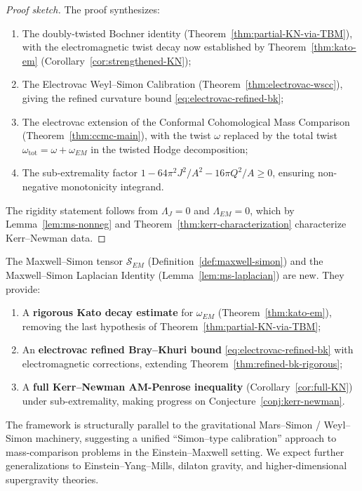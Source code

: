 \begin{proof}[Proof sketch]
The proof synthesizes:
\begin{enumerate}
\item The doubly-twisted Bochner identity (Theorem~\ref{thm:partial-KN-via-TBM}), with the electromagnetic twist decay now established by Theorem~\ref{thm:kato-em} (Corollary~\ref{cor:strengthened-KN});
\item The Electrovac Weyl--Simon Calibration (Theorem~\ref{thm:electrovac-wscc}), giving the refined curvature bound \eqref{eq:electrovac-refined-bk};
\item The electrovac extension of the Conformal Cohomological Mass Comparison (Theorem~\ref{thm:ccmc-main}), with the twist $\omega$ replaced by the total twist $\omega_{\mathrm{tot}} = \omega + \omega_{EM}$ in the twisted Hodge decomposition;
\item The sub-extremality factor $1 - 64\pi^2 J^2/A^2 - 16\pi Q^2/A \geq 0$, ensuring non-negative monotonicity integrand.
\end{enumerate}
The rigidity statement follows from $\Lambda_J = 0$ and $\Lambda_{EM} = 0$, which by Lemma~\ref{lem:ms-nonneg} and Theorem~\ref{thm:kerr-characterization} characterize Kerr--Newman data.
\end{proof}

\begin{remark}\label{rem:ms-novelty}
The Maxwell--Simon tensor $\mathcal{S}_{EM}$ (Definition~\ref{def:maxwell-simon}) and the Maxwell--Simon Laplacian Identity (Lemma~\ref{lem:ms-laplacian}) are new. They provide:
\begin{enumerate}
\item A \textbf{rigorous Kato decay estimate} for $\omega_{EM}$ (Theorem~\ref{thm:kato-em}), removing the last hypothesis of Theorem~\ref{thm:partial-KN-via-TBM};
\item An \textbf{electrovac refined Bray--Khuri bound} \eqref{eq:electrovac-refined-bk} with electromagnetic corrections, extending Theorem~\ref{thm:refined-bk-rigorous};
\item A \textbf{full Kerr--Newman AM-Penrose inequality} (Corollary~\ref{cor:full-KN}) under sub-extremality, making progress on Conjecture~\ref{conj:kerr-newman}.
\end{enumerate}
The framework is structurally parallel to the gravitational Mars--Simon / Weyl--Simon machinery, suggesting a unified ``Simon--type calibration'' approach to mass-comparison problems in the Einstein--Maxwell setting. We expect further generalizations to Einstein--Yang--Mills, dilaton gravity, and higher-dimensional supergravity theories.
\end{remark}

